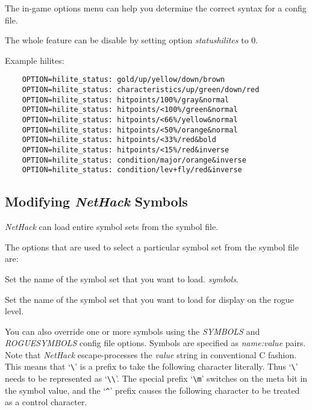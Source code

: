 The in-game options menu can help you determine the correct syntax for a
config file.

The whole feature can be disable by setting option {\it statushilites} to 0.

Example hilites:
\begin{verbatim}
    OPTION=hilite_status: gold/up/yellow/down/brown
    OPTION=hilite_status: characteristics/up/green/down/red
    OPTION=hilite_status: hitpoints/100%/gray&normal
    OPTION=hilite_status: hitpoints/<100%/green&normal
    OPTION=hilite_status: hitpoints/<66%/yellow&normal
    OPTION=hilite_status: hitpoints/<50%/orange&normal
    OPTION=hilite_status: hitpoints/<33%/red&bold
    OPTION=hilite_status: hitpoints/<15%/red&inverse
    OPTION=hilite_status: condition/major/orange&inverse
    OPTION=hilite_status: condition/lev+fly/red&inverse
\end{verbatim}

\subsection*{Modifying {\it NetHack\/} Symbols}

{\it NetHack\/} can load entire symbol sets from the symbol file.

The options that are used to select a particular symbol set from the
symbol file are:

\blist{}
\item[\ib{symset}]
Set the name of the symbol set that you want to load.
{\it symbols\/}.

\item[\ib{roguesymset}]
Set the name of the symbol set that you want to load for display
on the rogue level.
\elist

You can also override one or more symbols using the {\it SYMBOLS\/} and
{\it ROGUESYMBOLS\/} config file options. Symbols are specified as
{\it name:value\/} pairs. Note that {\it NetHack\/} escape-processes
the {\it value\/} string in conventional C fashion.  This means that `\verb+\+'
is a prefix to take the following character literally.  Thus `\verb+\+' needs
to be represented as `\verb+\\+'.
The special prefix
`\verb+\m+' switches on the meta bit in the symbol value, and the
`{\tt \^{}}' prefix causes the following character to be treated as a control
character.

